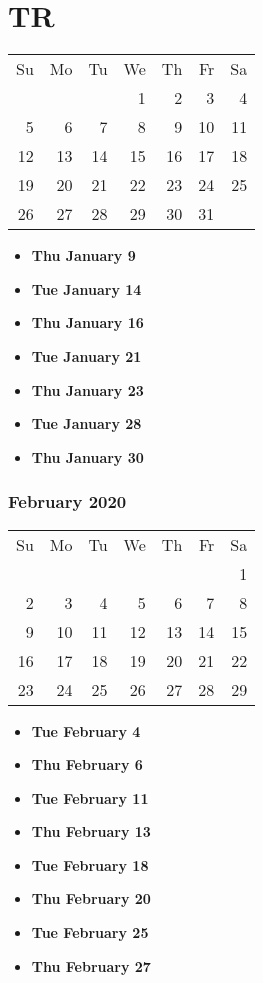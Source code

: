 \documentclass[11pt]{article}
\begin{document}
\section{TR}
\begin{tabular}{rrrrrrr}
Su & Mo & Tu & We & Th & Fr & Sa\\
   &    &    &  1 &  2 &  3 &  4\\ 
 5 &  6 &  7 &  8 &  9 & 10 & 11\\ 
12 & 13 & 14 & 15 & 16 & 17 & 18\\ 
19 & 20 & 21 & 22 & 23 & 24 & 25\\ 
26 & 27 & 28 & 29 & 30 & 31 &\\
\end{tabular}
\begin{itemize}
\item\textbf{Thu January  9}
\item\textbf{Tue January 14}
\item\textbf{Thu January 16}
\item\textbf{Tue January 21}
\item\textbf{Thu January 23}
\item\textbf{Tue January 28}
\item\textbf{Thu January 30}
\end{itemize}
\hrulefill

\subsubsection*{February 2020}
\begin{tabular}{rrrrrrr}
Su & Mo & Tu & We & Th & Fr & Sa\\
   &    &    &    &    &    &  1\\ 
 2 &  3 &  4 &  5 &  6 &  7 &  8\\ 
 9 & 10 & 11 & 12 & 13 & 14 & 15\\ 
16 & 17 & 18 & 19 & 20 & 21 & 22\\ 
23 & 24 & 25 & 26 & 27 & 28 & 29\\ 
\end{tabular}
\begin{itemize}
\item\textbf{Tue February  4}
\item\textbf{Thu February  6}
\item\textbf{Tue February 11}
\item\textbf{Thu February 13}
\item\textbf{Tue February 18}
\item\textbf{Thu February 20}
\item\textbf{Tue February 25}
\item\textbf{Thu February 27}
\end{itemize}
\hrulefill
\end{document}
